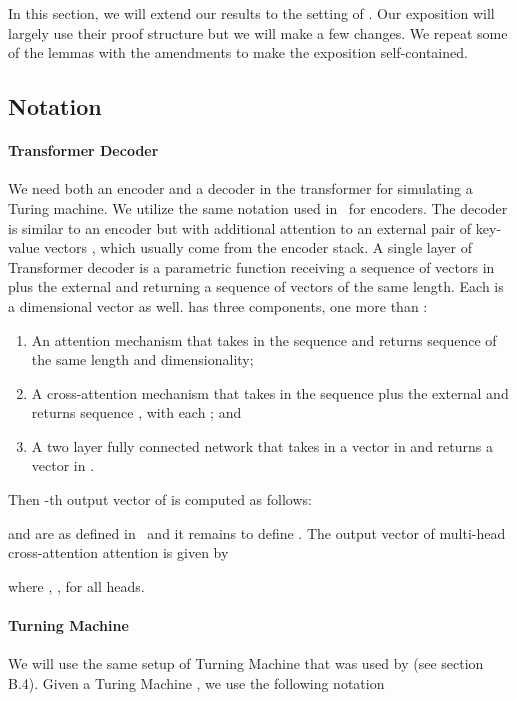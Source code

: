 \documentclass{article}
\begin{document}
In this section, we will extend our results to the setting of \citet{Perez19}. Our 
exposition will largely use their proof structure but we will make a few changes. 
We  repeat some of the lemmas with the amendments to make the exposition 
self-contained. 



\subsection{Notation}
\paragraph{Transformer Decoder}
We need both an encoder and a decoder in the transformer for simulating a Turing machine.
We utilize the same notation used in~ for encoders. 
The decoder is similar to an encoder but with additional attention to an external pair of key-value vectors , which usually come from the encoder stack.
A single layer of Transformer decoder is a parametric function  receiving a sequence  of vectors in  plus the external  and returning a sequence of vectors  of the same length. Each  is a  dimensional vector as well.   has three components, one more than :
\begin{enumerate}[leftmargin=6mm, itemsep=2mm, partopsep=0pt,parsep=0pt]
    \item An attention mechanism  that takes in the sequence  and returns sequence  of the same length and dimensionality;  
    \item A cross-attention mechanism  that takes in the sequence  plus the external  and returns sequence , with each ; and
    \item A two layer fully connected network  that takes in a vector in  and returns a vector in . 
\end{enumerate}
\vspace{-2mm}
Then -th output vector of  is computed as follows:

 and  are as defined in~ and it remains to define .
The  output vector of multi-head cross-attention attention is given by

where , , for all  heads.


\paragraph{Turning Machine}
We will use the same setup of Turning Machine that was used by \citet{Perez19} (see section B.4). 
Given a Turing Machine , we use the following notation
\end{document}
